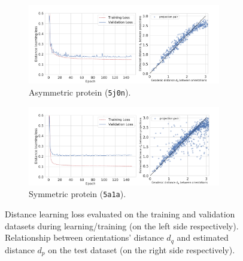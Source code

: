 \begin{figure}
    \centering
    \begin{subfigure}[t]{0.45\linewidth}
        \includegraphics[height=3.5cm]{figures/de_loss_dPdQ_5j0n.pdf}
        \caption{Asymmetric protein (\texttt{5j0n}).}
        \label{fig:losses-siamese-assym}
    \end{subfigure} \quad \quad
    \begin{subfigure}[t]{0.5\linewidth}
        \includegraphics[height=3.5cm]{figures/de_loss_dPdQ_5a1a.pdf}
        \caption{Symmetric protein (\texttt{5a1a}).}
        \label{fig:losses-siamese-sym}
    \end{subfigure}
    \caption{
        Distance learning loss  evaluated on the training and validation datasets during learning/training (on the left side respectively). Relationship between orientations' distance $d_q$ and estimated distance $d_p$ on the test dataset (on the right side respectively).
    }\label{fig:losses-siamese}
\end{figure}


